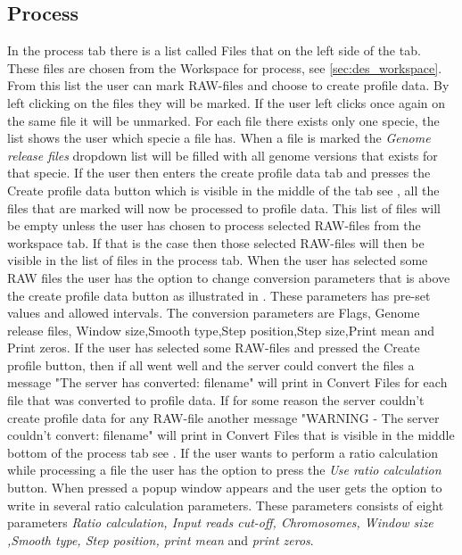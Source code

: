 \subsection{Process}
In the process tab there is a list called Files that on the left side of the tab. These files are chosen from the Workspace for process, see \ref{sec:des_workspace}. From this list the user can mark RAW-files and choose to create profile data. By left clicking on the files they will be marked. If the user left clicks once again on the same file it will be unmarked. For each file there exists only one specie, the list shows the user which specie a file has. When a file is marked the \emph{Genome release files} dropdown list will be filled with all genome versions that exists for that specie. If the user then enters the create profile data tab and presses the Create profile data button which is visible in the middle of the tab see , all the files that are marked will now be processed to profile data. This list of files will be empty unless the user has chosen to process selected RAW-files from the workspace tab. If that is the case then those selected RAW-files will then be visible in the list of files in the process tab. When the user has selected some RAW files the user has the option to change conversion parameters that is above the create profile data button as illustrated in . These parameters has pre-set values and allowed intervals. The conversion parameters are Flags, Genome release files, Window size,Smooth type,Step position,Step size,Print mean and Print zeros. If the user has selected some RAW-files and pressed the Create profile button, then if all went well and the server could convert the files a message "The server has converted: filename" will print in Convert Files for each file that was converted to profile data. If for some reason the server couldn't create profile data for any RAW-file another message "WARNING - The server couldn't convert: filename" will print in Convert Files that is visible in the middle bottom of the process tab see . If the user wants to perform a ratio calculation while processing a file the user has the option to press the \emph{Use ratio calculation} button. When pressed a popup window appears and the user gets the option to write in several ratio calculation parameters. These parameters consists of eight parameters \emph{Ratio calculation, Input reads cut-off, Chromosomes, Window size ,Smooth type, Step position, print mean} and  \emph{print zeros}.


